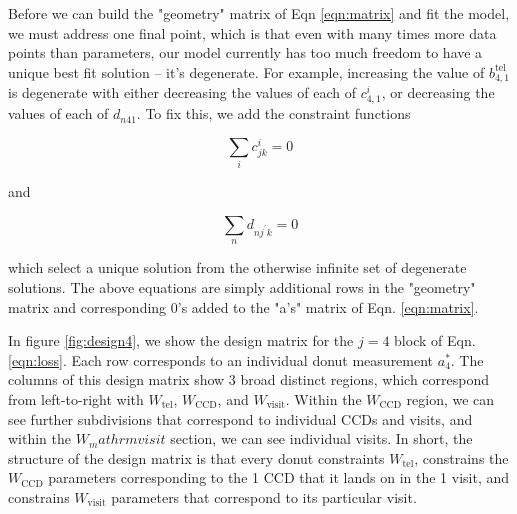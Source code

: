 \documentclass{article}
\begin{document}
Before we can build the "geometry" matrix of Eqn \ref{eqn:matrix} and fit the
model, we must address one final point, which is that even with many times more
data points than parameters, our model currently has too much freedom to have a
unique best fit solution -- it's degenerate.  For example, increasing the value
of $b^\mathrm{tel}_{4,1}$ is degenerate with either decreasing the values of
each of $c^i_{4,1}$, or decreasing the values of each of $d_{n 4 1}$.  To fix
this, we add the constraint functions

\begin{equation}
  \sum_i c^i_{jk} = 0
\end{equation}

and

\begin{equation}
  \sum_{n} d_{n j^\prime k} = 0
\end{equation}

which select a unique solution from the otherwise infinite set of degenerate
solutions.  The above equations are simply additional rows in the "geometry"
matrix and corresponding 0's added to the "a's" matrix of Eqn. \ref{eqn:matrix}.

In figure \ref{fig:design4}, we show the design matrix for the $j=4$ block of
Eqn. \ref{eqn:loss}.  Each row corresponds to an individual donut measurement
$a^*_4$.  The columns of this design matrix show 3 broad distinct regions, which
correspond from left-to-right with $W_\mathrm{tel}$, $W_\mathrm{CCD}$, and
$W_\mathrm{visit}$.  Within the $W_\mathrm{CCD}$ region, we can see further
subdivisions that correspond to individual CCDs and visits, and within the
$W_mathrm{visit}$ section, we can see individual visits.  In short, the
structure of the design matrix is that every donut constraints $W_\mathrm{tel}$,
constrains the $W_\mathrm{CCD}$ parameters corresponding to the 1 CCD that it
lands on in the 1 visit, and constrains $W_\mathrm{visit}$ parameters that
correspond to its particular visit.
\end{document}
